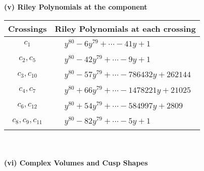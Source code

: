 \documentclass[1p]{elsarticle_modified}
\theoremstyle{definition}
\begin{document}
\newpage\renewcommand{\arraystretch}{1}
\flushleft \textbf{(v) Riley Polynomials at the component}\newline \\
\begin{tabular}{m{50pt}|m{274pt}}
Crossings & \hspace{64pt}Riley Polynomials at each crossing \\
\hline $$\begin{aligned}c_{1}\end{aligned}$$&$\begin{aligned}
&y^{80}-6 y^{79}+\cdots-41 y+1
\end{aligned}$\\
\hline $$\begin{aligned}c_{2},c_{5}\end{aligned}$$&$\begin{aligned}
&y^{80}-42 y^{79}+\cdots-9 y+1
\end{aligned}$\\
\hline $$\begin{aligned}c_{3},c_{10}\end{aligned}$$&$\begin{aligned}
&y^{80}-57 y^{79}+\cdots-786432 y+262144
\end{aligned}$\\
\hline $$\begin{aligned}c_{4},c_{7}\end{aligned}$$&$\begin{aligned}
&y^{80}+66 y^{79}+\cdots-1478221 y+21025
\end{aligned}$\\
\hline $$\begin{aligned}c_{6},c_{12}\end{aligned}$$&$\begin{aligned}
&y^{80}+54 y^{79}+\cdots-584997 y+2809
\end{aligned}$\\
\hline $$\begin{aligned}c_{8},c_{9},c_{11}\end{aligned}$$&$\begin{aligned}
&y^{80}-82 y^{79}+\cdots-5 y+1
\end{aligned}$\\
\hline
\end{tabular}\\~\\
\newpage\flushleft \textbf{(vi) Complex Volumes and Cusp Shapes}
\end{document}
